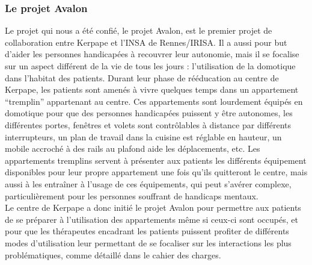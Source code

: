 \subsubsection{Le projet Avalon}

Le projet qui nous a été confié, le projet Avalon, est le premier projet de collaboration entre Kerpape et l'INSA de Rennes/IRISA. Il a aussi pour but d'aider les personnes handicapées à recouvrer leur autonomie, mais il se focalise sur un aspect différent de la vie de tous les jours : l'utilisation de la domotique dans l'habitat des patients. Durant leur phase de rééducation au centre de Kerpape, les patients sont amenés à vivre quelques temps dans un appartement \enquote{tremplin} appartenant au centre. Ces appartements sont lourdement équipés en domotique pour que des personnes handicapées puissent y être autonomes, les différentes portes, fenêtres et volets sont contrôlables à distance par différents interrupteurs, un plan de travail dans la cuisine est réglable en hauteur, un mobile accroché à des rails au plafond aide les déplacements, etc.
Les appartements tremplins servent à présenter aux patients les différents équipement disponibles pour leur propre appartement une fois qu'ils quitteront le centre, mais aussi à les entraîner à l'usage de ces équipements, qui peut s'avérer complexe, particulièrement pour les personnes souffrant de handicaps mentaux. \\

Le centre de Kerpape a donc initié le projet Avalon pour permettre aux patients de se préparer à l'utilisation des appartements même si ceux-ci sont occupés, et pour que les thérapeutes encadrant les patients puissent profiter de différents modes d'utilisation leur permettant de se focaliser sur les interactions les plus problématiques, comme détaillé dans le cahier des charges.
